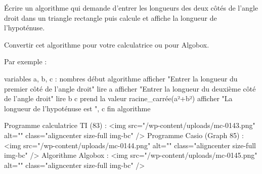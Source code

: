 
%
Écrire un algorithme qui demande d'entrer les longueurs des deux côtés de l'angle droit dans un triangle rectangle puis calcule et affiche la longueur de l'hypoténuse.
\par 
Convertir cet algorithme pour votre calculatrice ou pour Algobox.
\begin{corrige}
     Par exemple :
     \begin{code}variables
   a, b, c : nombres
début algorithme
   afficher "Entrer la longueur du premier côté de l'angle droit"
   lire a
   afficher "Entrer la longueur du deuxième côté de l'angle droit"
   lire b
   c prend la valeur racine_carrée(a²+b²)
   afficher "La longueur de l'hypoténuse est ", c
fin algorithme
     \end{code}
     Programme calculatrice TI (83) :
     <img src="/wp-content/uploads/mc-0143.png" alt="" class="aligncenter size-full  img-bc" />
     Programme Casio (Graph 85) :
     <img src="/wp-content/uploads/mc-0144.png" alt="" class="aligncenter size-full  img-bc" />
     Algorithme Algobox :
     <img src="/wp-content/uploads/mc-0145.png" alt="" class="aligncenter size-full  img-bc" />
\end{corrige}
